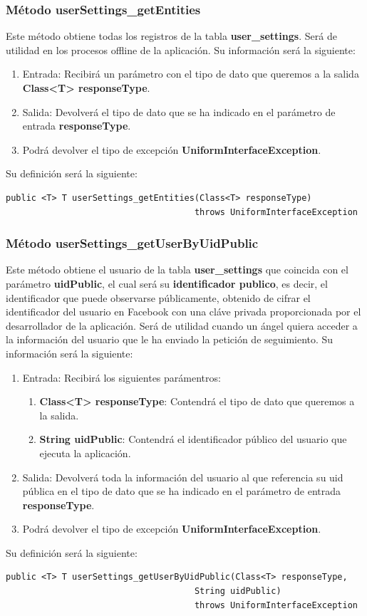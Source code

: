 \subsubsection{Método userSettings\_getEntities}
Este método obtiene todas los registros de la tabla \textbf{user\_settings}. Será de utilidad en los procesos offline de la aplicación. Su información será la siguiente:
\begin{enumerate}
\item Entrada: Recibirá un parámetro con el tipo de dato que queremos a la salida \textbf{Class<T> responseType}.
\item Salida: Devolverá el tipo de dato que se ha indicado en el parámetro de entrada \textbf{responseType}.
\item Podrá devolver el tipo de excepción \textbf{UniformInterfaceException}.
\end{enumerate}
\bigskip
\par
Su definición será la siguiente:
\begin{verbatim}public <T> T userSettings_getEntities(Class<T> responseType) 
                                     throws UniformInterfaceException \end{verbatim}

\subsubsection{Método userSettings\_getUserByUidPublic}
Este método obtiene el usuario de la tabla \textbf{user\_settings} que coincida con el parámetro \textbf{uidPublic}, el cual será su \textbf{identificador publico}, es decir, el identificador que puede observarse públicamente, obtenido de cifrar el identificador del usuario en Facebook con una cláve privada proporcionada por el desarrollador de la aplicación. Será de utilidad cuando un ángel quiera acceder a la información del usuario que le ha enviado la petición de seguimiento. Su información será la siguiente:
\begin{enumerate}
\item Entrada: Recibirá los siguientes parámentros:
\begin{enumerate}
\item \textbf{Class<T> responseType}: Contendrá el tipo de dato que queremos a la salida. 
\item \textbf{String uidPublic}: Contendrá el identificador público del usuario que ejecuta la aplicación.
\end{enumerate}
\item Salida: Devolverá toda la información del usuario al que referencia su uid pública en el tipo de dato que se ha indicado en el parámetro de entrada \textbf{responseType}.
\item Podrá devolver el tipo de excepción \textbf{UniformInterfaceException}.
\end{enumerate}
\bigskip
\par
Su definición será la siguiente:
\begin{verbatim}public <T> T userSettings_getUserByUidPublic(Class<T> responseType, 
                                     String uidPublic) 
                                     throws UniformInterfaceException \end{verbatim}

